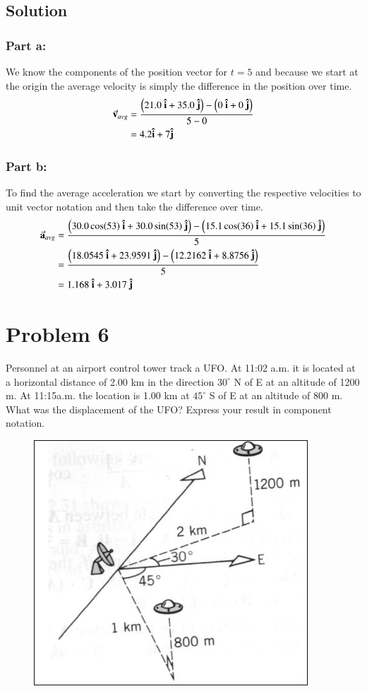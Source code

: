 \documentclass{article}
\begin{document}
\subsection*{Solution}
\subsubsection*{Part a:}
We know the components of the position vector for $t = 5$ and because we start at the origin the average velocity is simply the difference in the position over time.
\begin{align*}
	\va v_{avg} &= \frac{\left( 21.0\ \vu i + 35.0\ \vu j \right) - \left( 0\ \vu i + 0\ \vu j \right)}{5 - 0} \\
		  &= 4.2 \vu i + 7 \vu j
\end{align*}

\subsubsection*{Part b:}
To find the average acceleration we start by converting the respective velocities to unit vector notation and then take the difference over time.
\begin{align*}
	\va a_{avg} &= \frac{\left(30.0 \cos(53)\ \vu i + 30.0 \sin (53)\ \vu j \right) - \left(15.1 \cos(36)\ \vu i + 15.1 \sin (36)\ \vu j\right)}{5}\\
		    &= \frac{\left( 18.0545\ \vu i + 23.9591\ \vu j\right) - \left(12.2162\ \vu i + 8.8756\ \vu j \right)}{5} \\
		    &= 1.168\ \vu i + 3.017\ \vu j
\end{align*}

\section*{Problem 6}
Personnel at an airport control tower track a UFO. At 11:02 a.m. it is located at a horizontal distance of 2.00 km in the direction $30^\circ$ N of E at an altitude of 1200 m.
At 11:15a.m. the location is 1.00 km at $45^\circ$ S of E at an altitude of 800 m.
What was the displacement of the UFO? Express your result in component notation.
\begin{figure}[ht]
    \centering
    \includegraphics[scale=0.5]{drawing-1.png}
\end{figure}
\end{document}
